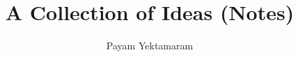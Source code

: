 \documentclass{article}
\title{A Collection of Ideas (Notes)}
\author{Payam Yektamaram}
\begin{document}
\maketitle
\pagebreak
\tableofcontents
\end{document}

